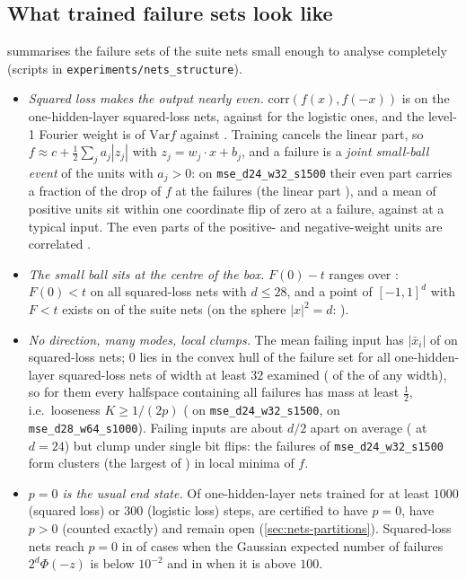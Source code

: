 \subsection{What trained failure sets look like}\label{sec:nets-structure}

 summarises the failure sets of the suite nets small enough
to analyse completely (scripts in \texttt{experiments/}\allowbreak\texttt{nets\_structure}).
\begin{itemize}
\item \emph{Squared loss makes the output nearly even.} $\mathrm{corr}(f(x),f(-x))$ is
\nnCorrMse{} on the one-hidden-layer squared-loss nets, against \nnCorrBce{} for the
logistic ones, and the level-1 Fourier weight is \nnLOneMse{} of $\mathrm{Var}f$
against \nnLOneBce{}. Training cancels the linear part, so
$f\approx c+\frac12\sum_ja_j|z_j|$ with $z_j=w_j\cdot x+b_j$, and a failure is a
\emph{joint small-ball event} of the units with $a_j>0$: on
\texttt{mse\_d24\_w32\_s1500} their even part carries a fraction \nnSOneFiveShareEp{} of
the drop of $f$ at the failures (the linear part \nnSOneFiveShareL{}), and a mean of
\nnSOneFiveSmallS{} positive units sit within one coordinate flip of zero at a
failure, against \nnSOneFiveSmallR{} at a typical input. The even parts of the
positive- and negative-weight units are correlated \nnCorrEvenPM{}.
\item \emph{The small ball sits at the centre of the box.} $F(0)-t$ ranges over
\nnFzeroRange{}: $F(0)<t$ on all \nnFzeroBelowMse{} squared-loss nets with $d\le28$, and a
point of $[-1,1]^d$ with $F<t$ exists on \nnBoxWitness{} of the \nnSuiteNets{} suite
nets (on the sphere $|x|^2=d$: \nnSphereWitness{}).
\item \emph{No direction, many modes, local clumps.} The mean failing input has
$|\bar x_i|$ of \nnMeanCoordMse{} on squared-loss nets; $0$ lies in the convex hull of
the failure set for all \nnHullWide{} one-hidden-layer squared-loss nets of width at least
$32$ examined (\nnHullOneZero{} of the \nnHullOne{} of any width), so for them every
halfspace containing all failures has mass at least $\frac12$, i.e.\ looseness
$K\ge1/(2p)$ (\nnSOneFiveHalfK{} on
\texttt{mse\_d24\_w32\_s1500}, \nnHalfKdTwoEight{} on \texttt{mse\_d28\_w64\_s1000}). Failing
inputs are about $d/2$ apart on average (\nnSOneFiveHam{} at $d=24$) but clump under
single bit flips: the \nnSmallDF{} failures of \texttt{mse\_d24\_w32\_s1500} form
\nnSOneFiveClusters{} clusters (the largest of \nnSOneFiveLargest{}) in
\nnSOneFiveMinima{} local minima of $f$.
\item \emph{$p=0$ is the usual end state.} Of \nnZeroNets{} one-hidden-layer nets
trained for at least $1000$ (squared loss) or $300$ (logistic loss) steps,
\nnZeroZero{} are certified to have $p=0$, \nnZeroPos{} have $p>0$ (counted exactly)
and \nnZeroOpen{} remain open (\cref{sec:nets-partitions}). Squared-loss nets reach $p=0$ in \nnPzeroLowCount{} of
cases when the Gaussian expected number of failures $2^d\Phi(-z)$ is below $10^{-2}$
and in \nnPzeroHighCount{} when it is above $100$.
\end{itemize}

